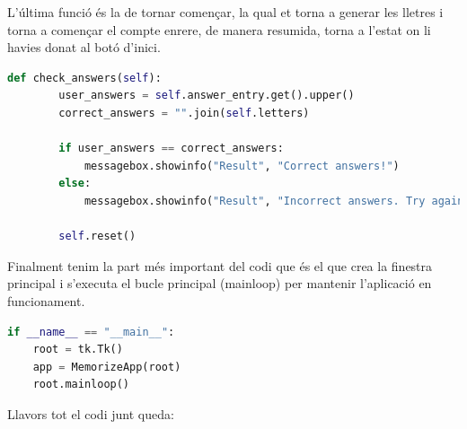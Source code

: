 L'última funció és la de tornar començar, la qual et torna a generar les lletres i torna a començar el compte enrere, de manera resumida, torna a l'estat on li havies donat al botó d'inici.

\begin{lstlisting}[language=Python, style=colorEX, caption=Funció per tornar a començar]
    def check_answers(self):
        user_answers = self.answer_entry.get().upper()
        correct_answers = "".join(self.letters)

        if user_answers == correct_answers:
            messagebox.showinfo("Result", "Correct answers!")
        else:
            messagebox.showinfo("Result", "Incorrect answers. Try again.")

        self.reset()
\end{lstlisting}

Finalment tenim la part més important del codi que és el que crea la finestra principal i s'executa el bucle principal (mainloop)  per mantenir l'aplicació en funcionament.

\begin{lstlisting}[language=Python, style=colorEX, caption=Bucle per mantenir l'aplicació en funcionament]
if __name__ == "__main__":
    root = tk.Tk()
    app = MemorizeApp(root)
    root.mainloop()
\end{lstlisting}

Llavors tot el codi junt queda:

